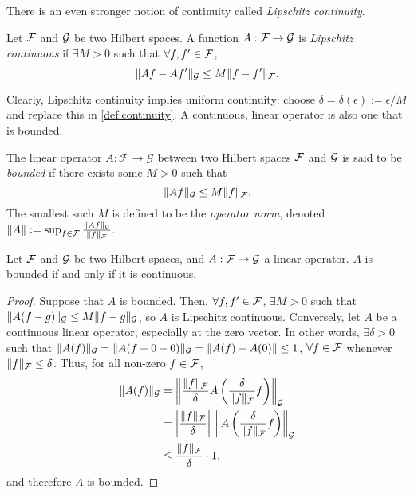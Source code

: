 There is an even stronger notion of continuity called  \emph{Lipschitz continuity}.

\begin{definition}
  Let ${\mathcal F}$ and ${\mathcal G}$ be two Hilbert spaces.  
  A function $A:{\mathcal F}\to{\mathcal G}$ is \emph{Lipschitz continuous} if $\exists M >0$ such that $\forall f,f'\in{\mathcal F}$,
  \[
    \lVert Af - Af'\rVert_{\mathcal G} \leq M \lVert f - f'\rVert_{\mathcal F}.
  \]
\end{definition}
%
Clearly, Lipschitz continuity implies uniform continuity: choose $\delta = \delta(\epsilon) := \epsilon/M$ and replace this in  \cref{def:continuity}.
A continuous, linear operator is also one that is bounded.
%
\begin{definition}\label{def:boundedop}
  The linear operator $A:\mathcal F \rightarrow \mathcal G$ between two Hilbert spaces ${\mathcal F}$ and ${\mathcal G}$ is said to be \emph{bounded} if there exists some $M>0$ such that
  \[
    \lVert Af\rVert_{\mathcal G} \leq M \lVert f\rVert_{\mathcal F}.
  \] 
  The smallest such $M$ is defined to be the \emph{operator norm}, denoted $\lVert A\rVert := \sup_{f\in{\mathcal F}} \frac{\lVert Af\rVert_{\mathcal G}}{\lVert f\rVert_{\mathcal F}}$.
\end{definition}
%
\begin{lemma}\label{thm:boundcont}
  Let ${\mathcal F}$ and ${\mathcal G}$ be two Hilbert spaces, and $A:{\mathcal F}\to{\mathcal G}$ a linear operator.
  $A$ is bounded if and only if it is continuous.
\end{lemma}
%
\begin{proof}
  Suppose that $A$ is bounded.
  Then, $\forall f,f' \in {\mathcal F}$, $\exists M>0$ such that $\lVert A(f-g)\rVert_{\mathcal G} \leq M \lVert f-g\rVert_{\mathcal G}$, so $A$ is Lipschitz continuous.
  Conversely, let $A$ be a continuous linear operator, especially at the zero vector.
  In other words, $\exists \delta > 0$ such that $\lVert A(f)\rVert_{\mathcal G} = \lVert A(f+0-0)\rVert_{\mathcal G} = \lVert A(f) - A(0)\rVert \leq 1$, $\forall f\in{\mathcal F}$ whenever $\lVert f\rVert_{\mathcal F} \leq \delta$.
  Thus, for all non-zero $f \in{\mathcal F}$,
  \begin{align*}
    \lVert A(f)\rVert_{\mathcal G} &= \left\Vert \frac{\lVert f\rVert_{\mathcal F}}{\delta} A\left(\frac{\delta}{\lVert f\rVert_{\mathcal F}}f\right)\right\Vert_{\mathcal G} \\
    &= \left\vert \frac{\lVert f\rVert_{\mathcal F}}{\delta}\right\vert \, \left\Vert A\left(\frac{\delta}{\lVert f\rVert_{\mathcal F}}f\right)\right\Vert_{\mathcal G} \\    
    &\leq \frac{\lVert f\rVert_{\mathcal F}}{\delta} \cdot 1,
  \end{align*}
  and therefore $A$ is bounded.
\end{proof}
